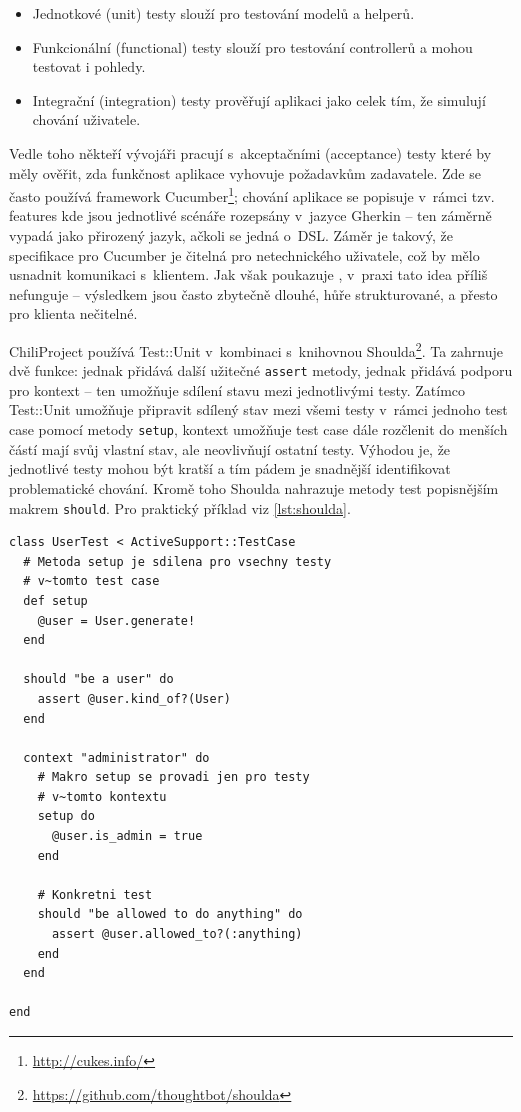\documentclass[thesis=B,czech]{FITthesis}[2012/05/02]
\begin{document}
\begin{itemize}
\item
  Jednotkové (unit) testy slouží pro testování modelů a helperů.
\item
  Funkcionální (functional) testy slouží pro testování controllerů a
  mohou testovat i pohledy.
\item
  Integrační (integration) testy prověřují aplikaci jako celek tím, že
  simulují chování uživatele.
\end{itemize}
Vedle toho někteří vývojáři pracují s~akceptačními (acceptance) testy
které by měly ověřit, zda funkčnost aplikace vyhovuje požadavkům
zadavatele. Zde se často používá framework Cucumber\footnote{\url{http://cukes.info/}};
chování aplikace se popisuje v~rámci tzv. features kde jsou jednotlivé
scénáře rozepsány v~jazyce Gherkin -- ten záměrně vypadá jako přirozený
jazyk, ačkoli se jedná o~\gls{DSL}. Záměr je takový, že specifikace pro
Cucumber je čitelná pro netechnického uživatele, což by mělo usnadnit
komunikaci s~klientem. Jak však poukazuje \citep{Kinsella2011}, v~praxi
tato idea příliš nefunguje -- výsledkem jsou často  zbytečně dlouhé, hůře strukturované, a přesto pro
klienta nečitelné.

ChiliProject používá Test::Unit v~kombinaci s~knihovnou
Shoulda\footnote{\url{https://github.com/thoughtbot/shoulda}}. Ta
zahrnuje dvě funkce: jednak přidává další užitečné \lstinline!assert!
metody, jednak přidává podporu pro kontext -- ten umožňuje sdílení stavu
mezi jednotlivými testy. Zatímco Test::Unit umožňuje připravit sdílený
stav mezi všemi testy v~rámci jednoho test case pomocí metody
\lstinline!setup!, kontext umožňuje test case dále rozčlenit do menších
částí mají svůj vlastní stav, ale neovlivňují ostatní testy. Výhodou je,
že jednotlivé testy mohou být kratší a tím pádem je snadnější
identifikovat problematické chování. Kromě toho Shoulda nahrazuje metody
test popisnějším makrem \lstinline!should!. Pro praktický příklad viz \autoref{lst:shoulda}.

\begin{lstlisting}[float,caption={Test case s frameworky Test::Unit a Shoulda},label=lst:shoulda]
class UserTest < ActiveSupport::TestCase
  # Metoda setup je sdilena pro vsechny testy
  # v~tomto test case
  def setup
    @user = User.generate!
  end

  should "be a user" do
    assert @user.kind_of?(User)
  end

  context "administrator" do
    # Makro setup se provadi jen pro testy
    # v~tomto kontextu
    setup do
      @user.is_admin = true
    end

    # Konkretni test
    should "be allowed to do anything" do
      assert @user.allowed_to?(:anything)
    end
  end

end
\end{lstlisting}
\end{document}
